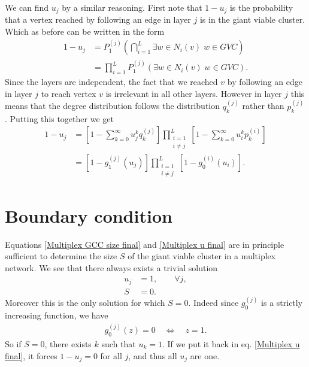 \documentclass[a4paper]{article}
\begin{document}
We can find $u_j$ by a similar reasoning. First note that $1 - u_j$ is the probability that a vertex reached by following an edge in layer $j$ is in the giant viable cluster. Which as before can be written in the form
\begin{align}
	1 - u_j &= P_1^{(j)}\left(\bigcap_{i = 1}^{L} \exists w \in N_i(v) \; w \in GVC\right)\\
	&= \prod_{i = 1}^{L}  P_1^{(j)}\left(\exists w \in N_i(v) \; w \in GVC \right).
\end{align}
Since the layers are independent, the fact that we reached $v$ by following an edge in layer $j$ to reach vertex $v$ is irrelevant in all other layers. However in layer $j$ this means that the degree distribution follows the distribution $q_k^{(j)}$ rather than $p_k^{(j)}$. Putting this together we get
\begin{align}
	1 - u_j &= \left[1 - \sum_{k = 0}^{\infty} u_j^k q_k^{(j)} \right] \prod_{\substack{i = 1 \\ i \neq j}}^{L}  \left[1 - \sum_{k = 0}^{\infty} u_i^k p^{(i)}_k \right] \\
	&= \left[1 - g_1^{(j)}(u_j) \right] \prod_{\substack{i = 1 \\ i \neq j}}^{L}  \left[1 - g_0^{(i)}(u_i) \right]. \label{Multiplex u final}
\end{align}


\section{Boundary condition}

Equations \eqref{Multiplex GCC size final} and \eqref{Multiplex u final} are in principle sufficient to determine the size $S$ of the giant viable cluster in a multiplex network. We see that there always exists a trivial solution
\begin{align}
	u_j &= 1, \qquad \forall j,\\
	S &= 0.
\end{align}
Moreover this is the only solution for which $S = 0$. Indeed since $g_0^{(j)}$ is a strictly increasing function, we have
\begin{align}
	g_0^{(j)}(z) = 0 \quad \Leftrightarrow \quad z = 1.
\end{align}
So if $S = 0$, there exists $k$ such that $u_k = 1$. If we put it back in eq. \eqref{Multiplex u final}, it forces $1 - u_j = 0$ for all $j$, and thus all $u_j$ are one.
\end{document}
